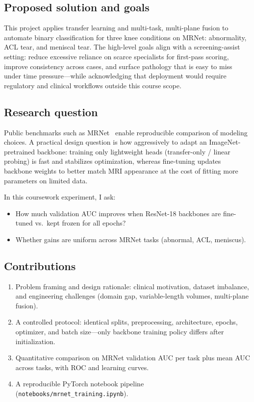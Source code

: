 \documentclass[10pt,twocolumn]{article}
\begin{document}
\subsection{Proposed solution and goals}

This project applies transfer learning and multi-task, multi-plane fusion to automate binary classification for three knee conditions on MRNet: abnormality, ACL tear, and meniscal tear. The high-level goals align with a screening-assist setting: reduce excessive reliance on scarce specialists for first-pass scoring, improve consistency across cases, and surface pathology that is easy to miss under time pressure---while acknowledging that deployment would require regulatory and clinical workflows outside this course scope.

\subsection{Research question}

Public benchmarks such as MRNet~\cite{bien2020deep} enable reproducible comparison of modeling choices. A practical design question is how aggressively to adapt an ImageNet-pretrained backbone: training only lightweight heads (transfer-only / linear probing) is fast and stabilizes optimization, whereas fine-tuning updates backbone weights to better match MRI appearance at the cost of fitting more parameters on limited data.

In this coursework experiment, I ask:
\begin{itemize}[noitemsep,topsep=0pt]
    \item How much validation AUC improves when ResNet-18 backbones are fine-tuned vs.\ kept frozen for all epochs?
    \item Whether gains are uniform across MRNet tasks (abnormal, ACL, meniscus).
\end{itemize}

\subsection{Contributions}

\begin{enumerate}[noitemsep,topsep=0pt]
    \item Problem framing and design rationale: clinical motivation, dataset imbalance, and engineering challenges (domain gap, variable-length volumes, multi-plane fusion).
    \item A controlled protocol: identical splits, preprocessing, architecture, epochs, optimizer, and batch size---only backbone training policy differs after initialization.
    \item Quantitative comparison on MRNet validation AUC per task plus mean AUC across tasks, with ROC and learning curves.
    \item A reproducible PyTorch notebook pipeline (\texttt{notebooks/mrnet\_training.ipynb}).
\end{enumerate}
\end{document}
